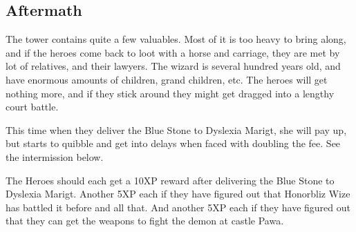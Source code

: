 \documentclass[11pt, twoside, titlepage, a4paper]{report}
\begin{document}
\subsection*{Aftermath}
The tower contains quite a few valuables. Most of it is too heavy to bring along, and if the heroes come back to loot with a horse and carriage, they are met by lot of relatives, and their lawyers. The wizard is several hundred years old, and have enormous amounts of children, grand children, etc. The heroes will get nothing more, and if they stick around they might get dragged into a lengthy court battle.

This time when they deliver the Blue Stone to Dyslexia Marigt, she will pay up, but starts to quibble and get into delays when faced with doubling the fee. See the intermission below.

The Heroes should each get a 10XP reward after delivering the Blue Stone to Dyslexia Marigt. Another 5XP each if they have figured out that Honorbliz Wize has battled it before and all that. And another 5XP each if they have figured out that they can get the weapons to fight the demon at castle Pawa.
\end{document}
